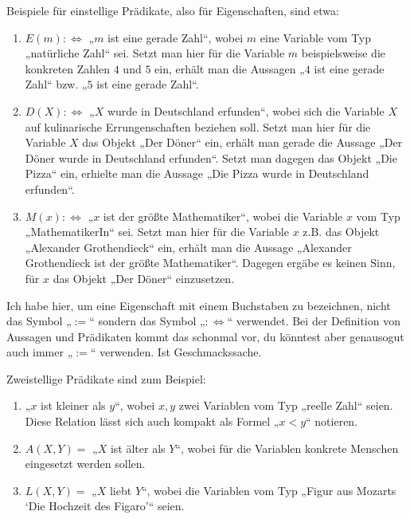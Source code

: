 \begin{bsp}
    Beispiele für einstellige Prädikate, also für Eigenschaften, sind etwa:
    \begin{enumerate}
        \item $E(m):\Leftrightarrow$ „$m$ ist eine gerade Zahl“, wobei $m$ eine Variable vom Typ „natürliche Zahl“ sei. Setzt man hier für die Variable $m$ beispielsweise die konkreten Zahlen $4$ und $5$ ein, erhält man die Aussagen „$4$ ist eine gerade Zahl“ bzw. „$5$ ist eine gerade Zahl“.
        \item $D(X):\Leftrightarrow$ „$X$ wurde in Deutschland erfunden“, wobei sich die Variable $X$ auf kulinarische Errungenschaften beziehen soll. Setzt man hier für die Variable $X$ das Objekt „Der Döner“ ein, erhält man gerade die Aussage „Der Döner wurde in Deutschland erfunden“. Setzt man dagegen das Objekt „Die Pizza“ ein, erhielte man die Aussage „Die Pizza wurde in Deutschland erfunden“.
        \item $M(x):\Leftrightarrow $ „$x$ ist der größte Mathematiker“, wobei die Variable $x$ vom Typ „MathematikerIn“ sei. Setzt man hier für die Variable $x$ z.B. das Objekt „Alexander Grothendieck“ ein, erhält man die Aussage „Alexander Grothendieck ist der größte Mathematiker“. Dagegen ergäbe es keinen Sinn, für $x$ das Objekt „Der Döner“ einzusetzen.
    \end{enumerate}
    Ich habe hier, um eine Eigenschaft mit einem Buchstaben zu bezeichnen, nicht das Symbol „$:=$“ sondern das Symbol „$:\Leftrightarrow$“ verwendet. Bei der Definition von Aussagen und Prädikaten kommt das schonmal vor, du könntest aber genausogut auch immer „$:=$“ verwenden. Ist Geschmackssache.
\end{bsp}


\begin{bsp}
    Zweistellige Prädikate sind zum Beispiel:
    \begin{enumerate}
        \item „$x$ ist kleiner als $y$“, wobei $x,y$ zwei Variablen vom Typ „reelle Zahl“ seien. Diese Relation lässt sich auch kompakt als Formel „$x<y$“ notieren.
        \item $A(X,Y)=$ „$X$ ist älter als $Y$“, wobei für die Variablen konkrete Menschen eingesetzt werden sollen.
        \item $L(X,Y)=$ „$X$ liebt $Y$“, wobei die Variablen vom Typ „Figur aus Mozarts `Die Hochzeit des Figaro'“ seien.
    \end{enumerate}
\end{bsp}






